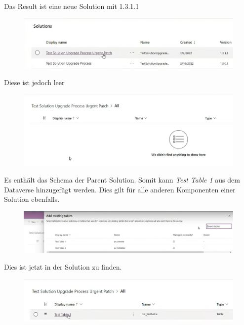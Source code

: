 Das Result ist eine neue Solution mit 1.3.1.1 
\begin{figure}[H]
	\centering
	\includegraphics[scale = 0.3]{attachment/chapter_13/Scc039}
\end{figure}
Diese ist jedoch leer
\begin{figure}[H]
	\centering
	\includegraphics[scale = 0.3]{attachment/chapter_13/Scc040}
\end{figure}
Es enthält das Schema der Parent Solution. Somit kann \textit{Test Table 1} aus dem Dataverse hinzugefügt werden. Dies gilt für alle anderen Komponenten einer Solution ebenfalls.
\begin{figure}[H]
	\centering
	\includegraphics[scale = 0.3]{attachment/chapter_13/Scc041}
\end{figure}
Dies ist jetzt in der Solution zu finden.
\begin{figure}[H]
	\centering
	\includegraphics[scale = 0.3]{attachment/chapter_13/Scc042}
\end{figure}

